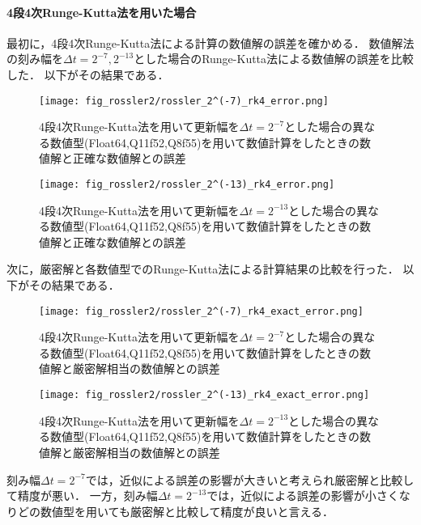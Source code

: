 \paragraph*{4段4次Runge-Kutta法を用いた場合}
最初に，4段4次Runge-Kutta法による計算の数値解の誤差を確かめる．
数値解法の刻み幅を$\Delta t = 2^{-7},2^{-13}$とした場合のRunge-Kutta法による数値解の誤差を比較した．
以下がその結果である．
\begin{figure}[H]
    \centering
    \begin{minipage}[b]{0.49\columnwidth}
        \centering
        \texttt{[image: fig\_rossler2/rossler\_2^(-7)\_rk4\_error.png]}
        \caption{4段4次Runge-Kutta法を用いて更新幅を$\Delta t = 2^{-7}$とした場合の異なる数値型(Float64,Q11f52,Q8f55)を用いて数値計算をしたときの数値解と正確な数値解との誤差}
        \label{fig:rossler_2^(-7)_rk4_error}
    \end{minipage}
    \begin{minipage}[b]{0.49\columnwidth}
        \centering
        \texttt{[image: fig\_rossler2/rossler\_2^(-13)\_rk4\_error.png]}
        \caption{4段4次Runge-Kutta法を用いて更新幅を$\Delta t =  2^{-13}$とした場合の異なる数値型(Float64,Q11f52,Q8f55)を用いて数値計算をしたときの数値解と正確な数値解との誤差}
        \label{fig:rossler_2^(-13)_rk4_error}
    \end{minipage}   
\end{figure}


次に，厳密解と各数値型でのRunge-Kutta法による計算結果の比較を行った．
以下がその結果である．\\
\begin{figure}[H]
    \centering
    \begin{minipage}[b]{0.49\columnwidth}
        \centering
        \texttt{[image: fig\_rossler2/rossler\_2^(-7)\_rk4\_exact\_error.png]}
        \caption{4段4次Runge-Kutta法を用いて更新幅を$\Delta t = 2^{-7}$とした場合の異なる数値型(Float64,Q11f52,Q8f55)を用いて数値計算をしたときの数値解と厳密解相当の数値解との誤差}   
        \label{fig:rossler_2^(-7)_rk4_exact_error}
    \end{minipage}
    \begin{minipage}[b]{0.49\columnwidth}
        \centering
        \texttt{[image: fig\_rossler2/rossler\_2^(-13)\_rk4\_exact\_error.png]}
        \caption{4段4次Runge-Kutta法を用いて更新幅を$\Delta t =  2^{-13}$とした場合の異なる数値型(Float64,Q11f52,Q8f55)を用いて数値計算をしたときの数値解と厳密解相当の数値解との誤差}
        \label{fig:rossler_2^(-13)_rk4_exact_error}
    \end{minipage}
\end{figure}
刻み幅$\Delta t = 2^{-7}$では，近似による誤差の影響が大きいと考えられ厳密解と比較して精度が悪い．
一方，刻み幅$\Delta t =  2^{-13}$では，近似による誤差の影響が小さくなりどの数値型を用いても厳密解と比較して精度が良いと言える．

